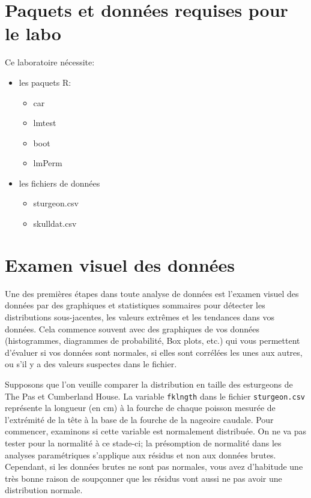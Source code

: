 \documentclass[12pt,]{book}
\providecommand{\tightlist}{%
  \setlength{\itemsep}{0pt}\setlength{\parskip}{0pt}}
\begin{document}
\hypertarget{set-t}{%
\section{Paquets et données requises pour le labo}\label{set-t}}

Ce laboratoire nécessite:

\begin{itemize}
\tightlist
\item
  les paquets R:

  \begin{itemize}
  \tightlist
  \item
    car
  \item
    lmtest
  \item
    boot
  \item
    lmPerm
  \end{itemize}
\item
  les fichiers de données

  \begin{itemize}
  \tightlist
  \item
    sturgeon.csv
  \item
    skulldat.csv
  \end{itemize}
\end{itemize}

\hypertarget{examen-visuel-des-donnuxe9es}{%
\section{Examen visuel des données}\label{examen-visuel-des-donnuxe9es}}

Une des premières étapes dans toute analyse de données est l'examen visuel des données par des graphiques et statistiques sommaires pour détecter les distributions sous-jacentes, les valeurs extrêmes et les tendances dans vos données. Cela commence souvent avec des graphiques de vos données (histogrammes, diagrammes de probabilité, Box plots, etc.) qui vous permettent d'évaluer si vos données sont normales, si elles sont corrélées les unes aux autres, ou s'il y a des valeurs suspectes dans le fichier.

Supposons que l'on veuille comparer la distribution en taille des esturgeons de The Pas et Cumberland House. La variable \texttt{fklngth} dans le fichier \texttt{sturgeon.csv} représente la longueur (en cm) à la fourche de chaque poisson mesurée de l'extrémité de la tête à la base de la fourche de la nageoire caudale. Pour commencer, examinons si cette variable est normalement distribuée. On ne va pas tester pour la normalité à ce stade-ci; la présomption de normalité dans les analyses paramétriques s'applique aux résidus et non aux données brutes. Cependant, si les données brutes ne sont pas normales, vous avez d'habitude une très bonne raison de soupçonner que les résidus vont aussi ne pas avoir une distribution normale.
\end{document}
